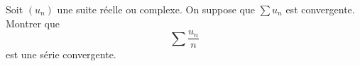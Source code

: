\begin{enonce}
\begin{exercise}[ID={RMS135 E1450},subtitle={Navale MP 2024},tags={},difficulty={}]
Soit $(u_n)$ une suite réelle ou complexe.
On suppose que $\sum u_n$
est convergente.
Montrer que 
\begin{equation*}
\sum \frac{u_n}{n}
\end{equation*}
est une série convergente.
\end{exercise}
\begin{solution}
\end{solution}
\end{enonce}
